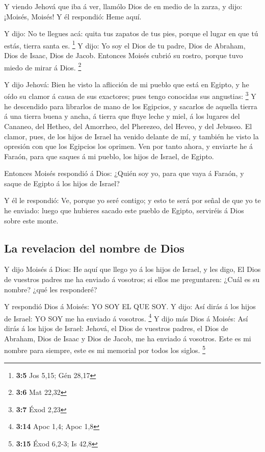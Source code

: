  Y viendo Jehová que iba á ver, llamólo Dios de en medio de
la zarza, y dijo: ¡Moisés, Moisés! Y él respondió: Heme aquí.

 Y dijo: No te llegues acá: quita tus zapatos de tus pies,
porque el lugar en que tú estás, tierra santa es. \footnote{\textbf{3:5}
  Jos 5,15; Gén 28,17}  Y dijo: Yo soy el Dios de tu padre,
Dios de Abraham, Dios de Isaac, Dios de Jacob. Entonces Moisés cubrió su
rostro, porque tuvo miedo de mirar á Dios. \footnote{\textbf{3:6} Mat
  22,32}

 Y dijo Jehová: Bien he visto la aflicción de mi pueblo que
está en Egipto, y he oído su clamor á causa de sus exactores; pues tengo
conocidas sus angustias: \footnote{\textbf{3:7} Éxod 2,23} 
Y he descendido para librarlos de mano de los Egipcios, y sacarlos de
aquella tierra á una tierra buena y ancha, á tierra que fluye leche y
miel, á los lugares del Cananeo, del Hetheo, del Amorrheo, del Pherezeo,
del Heveo, y del Jebuseo.  El clamor, pues, de los hijos de
Israel ha venido delante de mí, y también he visto la opresión con que
los Egipcios los oprimen.  Ven por tanto ahora, y enviarte
he á Faraón, para que saques á mi pueblo, los hijos de Israel, de
Egipto.

 Entonces Moisés respondió á Dios: ¿Quién soy yo, para que
vaya á Faraón, y saque de Egipto á los hijos de Israel?

 Y él le respondió: Ve, porque yo seré contigo; y esto te
será por señal de que yo te he enviado: luego que hubieres sacado este
pueblo de Egipto, serviréis á Dios sobre este monte.

\hypertarget{la-revelacion-del-nombre-de-dios}{%
\subsection{La revelacion del nombre de
Dios}\label{la-revelacion-del-nombre-de-dios}}

 Y dijo Moisés á Dios: He aquí que llego yo á los hijos de
Israel, y les digo, El Dios de vuestros padres me ha enviado á vosotros;
si ellos me preguntaren: ¿Cuál es su nombre? ¿qué les responderé?

 Y respondió Dios á Moisés: YO SOY EL QUE SOY. Y dijo: Así
dirás á los hijos de Israel: YO SOY me ha enviado á vosotros.
\footnote{\textbf{3:14} Apoc 1,4; Apoc 1,8}  Y dijo más
Dios á Moisés: Así dirás á los hijos de Israel: Jehová, el Dios de
vuestros padres, el Dios de Abraham, Dios de Isaac y Dios de Jacob, me
ha enviado á vosotros. Este es mi nombre para siempre, este es mi
memorial por todos los siglos. \footnote{\textbf{3:15} Éxod 6,2-3; Is
  42,8}

